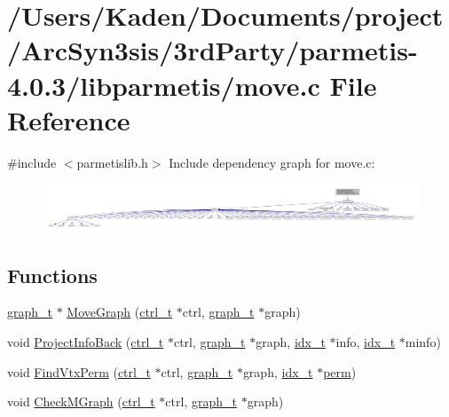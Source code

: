 \hypertarget{a00377}{}\section{/\+Users/\+Kaden/\+Documents/project/\+Arc\+Syn3sis/3rd\+Party/parmetis-\/4.0.3/libparmetis/move.c File Reference}
\label{a00377}
{\ttfamily \#include $<$parmetislib.\+h$>$}\newline
Include dependency graph for move.\+c\+:\nopagebreak
\begin{figure}[H]
\begin{center}
\leavevmode
\includegraphics[width=350pt]{a00378}
\end{center}
\end{figure}
\subsection*{Functions}
\begin{DoxyCompactItemize}
\item 
\hyperlink{a00734}{graph\+\_\+t} $\ast$ \hyperlink{a00377_a1cb4b51c6bbdb0cc5c28fd554121c7e1}{Move\+Graph} (\hyperlink{a00742}{ctrl\+\_\+t} $\ast$ctrl, \hyperlink{a00734}{graph\+\_\+t} $\ast$graph)
\item 
void \hyperlink{a00377_ab7eeb680cd7f08cdfa57220b05ed84dd}{Project\+Info\+Back} (\hyperlink{a00742}{ctrl\+\_\+t} $\ast$ctrl, \hyperlink{a00734}{graph\+\_\+t} $\ast$graph, \hyperlink{a00876_aaa5262be3e700770163401acb0150f52}{idx\+\_\+t} $\ast$info, \hyperlink{a00876_aaa5262be3e700770163401acb0150f52}{idx\+\_\+t} $\ast$minfo)
\item 
void \hyperlink{a00377_a52684c6453a561953675de42a87b5d91}{Find\+Vtx\+Perm} (\hyperlink{a00742}{ctrl\+\_\+t} $\ast$ctrl, \hyperlink{a00734}{graph\+\_\+t} $\ast$graph, \hyperlink{a00876_aaa5262be3e700770163401acb0150f52}{idx\+\_\+t} $\ast$\hyperlink{a00879_ab96e9eb84fc7c342d17690a1341645dd}{perm})
\item 
void \hyperlink{a00377_ae69f033a7361b8e9c204167082a30bca}{Check\+M\+Graph} (\hyperlink{a00742}{ctrl\+\_\+t} $\ast$ctrl, \hyperlink{a00734}{graph\+\_\+t} $\ast$graph)
\end{DoxyCompactItemize}


